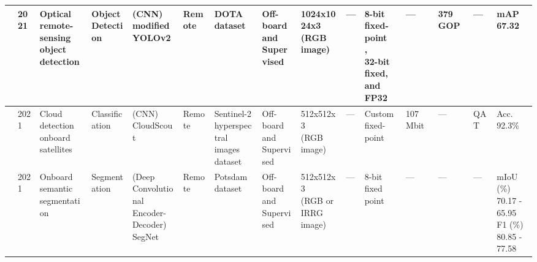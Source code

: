 \begin{center}
{\begin{tabular}{lllllllllllllll}
\cite{zhangFPGAImplementationCNNBased2021} & 2021 & \makecell[tl]{Optical\\ remote-sensing\\ object detection} & \makecell[tl]{Object\\ Detection} & \makecell[tl]{(CNN)\\ modified\\ YOLOv2} & Remote & DOTA dataset & \makecell[tl]{Off-board\\ and\\ Supervised} & \makecell[tl]{1024x1024x3\\ (RGB image)} & --- & \makecell[tl]{8-bit\\ fixed-point\\, \\ 32-bit fixed,\\ and FP32} & --- & 379 GOP & --- & mAP 67.32 \\ \hline
\cite{rapuanoFPGABasedHardwareAccelerator2021} & 2021 & \makecell[tl]{Cloud detection\\ onboard\\ satellites} & Classification & \makecell[tl]{(CNN)\\ CloudScout} & Remote & \makecell[tl]{Sentinel-2\\ hyperspectral\\ images dataset} & \makecell[tl]{Off-board\\ and\\ Supervised} & \makecell[tl]{512x512x3\\ (RGB image)} & --- & \makecell[tl]{Custom\\ fixed-point} & 107 Mbit & --- & QAT & Acc. 92.3\% \\ \hline
\cite{sabogalReconfigurableFrameworkResilient2021} & 2021 & \makecell[tl]{Onboard\\ semantic\\ segmentation} & Segmentation & \makecell[tl]{(Deep\\ Convolutional\\ Encoder-Decoder)\\ SegNet} & Remote & Potsdam dataset & \makecell[tl]{Off-board\\ and\\ Supervised} & \makecell[tl]{512x512x3\\ (RGB or\\ IRRG image)} & --- & \makecell[tl]{8-bit\\ fixed point} & --- & --- & --- & \makecell[tl]{mIoU (\%)\\ 70.17 - 65.95\\ F1 (\%)\\ 80.85 - 77.58}  \\ \hline

\end{tabular}}
\end{center}
